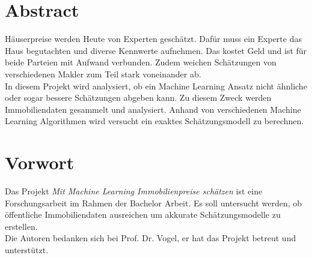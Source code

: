 \section*{Abstract}
Häuserpreise werden Heute von Experten geschätzt. Dafür muss ein Experte das Haus begutachten und diverse Kennwerte aufnehmen. Das kostet Geld und ist für beide Parteien mit Aufwand verbunden. Zudem weichen Schätzungen von verschiedenen Makler zum Teil stark voneinander ab.\\
In diesem Projekt wird analysiert, ob ein Machine Learning Ansatz nicht ähnliche oder sogar bessere Schätzungen abgeben kann. Zu diesem Zweck werden Immobiliendaten gesammelt und analysiert. Anhand von verschiedenen Machine Learning Algorithmen wird versucht ein exaktes Schätzungsmodell zu berechnen.
\section*{Vorwort}
Das Projekt \emph{Mit Machine Learning Immobilienpreise schätzen} ist eine Forschungsarbeit im Rahmen der Bachelor Arbeit. Es soll untersucht werden, ob öffentliche Immobiliendaten ausreichen um akkurate Schätzungsmodelle zu erstellen.\\[2ex]
Die Autoren bedanken sich bei Prof. Dr. Vogel, er hat das Projekt betreut und unterstützt. 

